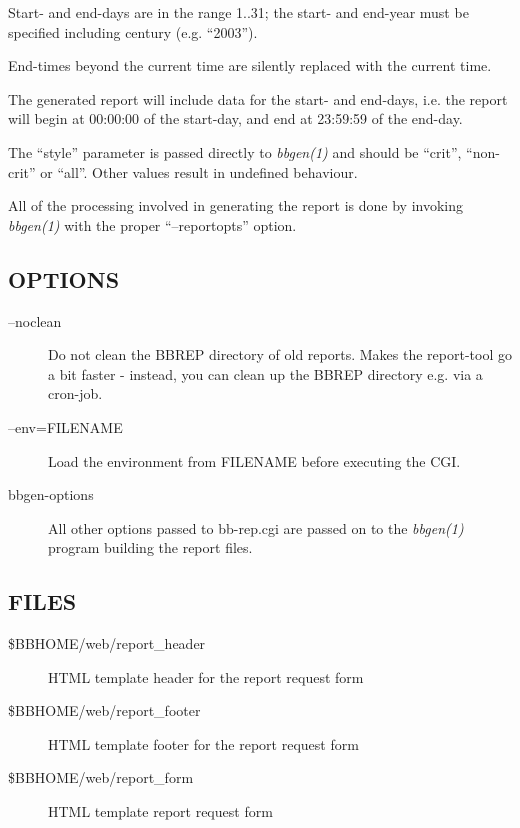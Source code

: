   Start- and end-days are in the range 1..31; the start- and end-year must be specified including century (e.g. ``2003''). 


  End-times beyond the current time are silently replaced with the current time. 


  The generated report will include data for the start- and end-days, i.e. the report will begin at 00:00:00 of the start-day, and end at 23:59:59 of the end-day. 


  The ``style'' parameter is passed directly to \emph{bbgen(1)}
 and should be ``crit'', ``non-crit'' or ``all''. Other values result in undefined behaviour. 


  All of the processing involved in generating the report is done by invoking \emph{bbgen(1)}
 with the proper ``--reportopts'' option. 


 
\subsection{OPTIONS}
\begin{description}
\item[--noclean] Do not clean the BBREP directory of old reports. Makes the report-tool go a bit faster - instead, you can clean up the BBREP directory e.g. via a cron-job. 

 

\item[--env=FILENAME] Load the environment from FILENAME before executing the CGI. 

 

\item[bbgen-options] All other options passed to bb-rep.cgi are passed on to the \emph{bbgen(1)}
 program building the report files. 

 


\end{description}
\subsection{FILES}
\begin{description}
\item[\$BBHOME/web/report\_header] HTML template header for the report request form 

 

\item[\$BBHOME/web/report\_footer] HTML template footer for the report request form 

 

\item[\$BBHOME/web/report\_form] HTML template report request form 

 


\end{description}
